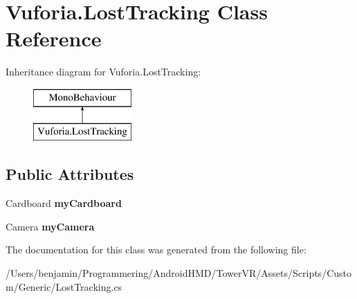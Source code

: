 \hypertarget{class_vuforia_1_1_lost_tracking}{}\section{Vuforia.\+Lost\+Tracking Class Reference}
\label{class_vuforia_1_1_lost_tracking}
Inheritance diagram for Vuforia.\+Lost\+Tracking\+:\begin{figure}[H]
\begin{center}
\leavevmode
\includegraphics[height=2.000000cm]{class_vuforia_1_1_lost_tracking}
\end{center}
\end{figure}
\subsection*{Public Attributes}
\begin{DoxyCompactItemize}
\item 
Cardboard {\bfseries my\+Cardboard}\hypertarget{class_vuforia_1_1_lost_tracking_a579fe3de0682d2ab61f5cd8ddaaa2d52}{}\label{class_vuforia_1_1_lost_tracking_a579fe3de0682d2ab61f5cd8ddaaa2d52}

\item 
Camera {\bfseries my\+Camera}\hypertarget{class_vuforia_1_1_lost_tracking_a62c8a70332b1f0127cf3bb5f05ae92c1}{}\label{class_vuforia_1_1_lost_tracking_a62c8a70332b1f0127cf3bb5f05ae92c1}

\end{DoxyCompactItemize}


The documentation for this class was generated from the following file\+:\begin{DoxyCompactItemize}
\item 
/\+Users/benjamin/\+Programmering/\+Android\+H\+M\+D/\+Tower\+V\+R/\+Assets/\+Scripts/\+Custom/\+Generic/Lost\+Tracking.\+cs\end{DoxyCompactItemize}
